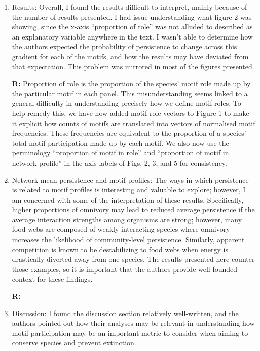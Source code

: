 \documentclass[12pt]{article}
\begin{document}
\begin{enumerate}
            \item Results: Overall, I found the results difficult to interpret, mainly because of the number of results presented. I had issue understanding what figure 2 was showing, since the x-axis ``proportion of role'' was not alluded to described as an explanatory variable anywhere in the text. I wasn't able to determine how the authors expected the probability of persistence to change across this gradient for each of the motifs, and how the results may have deviated from that expectation. This problem was mirrored in most of the figures presented.

                \textbf{R:} Proportion of role is the proportion of the species' motif role made up by the particular motif in each panel. This misunderstanding seems linked to a general difficulty in understanding precisely how we define motif roles. To help remedy this, we have now added motif role vectors to Figure 1 to make it explicit how counts of motifs are translated into vectors of normalised motif frequencies. These frequencies are equivalent to the proportion of a species' total motif participation made up by each motif. We also now use the perminology ``proportion of motif in role'' and ``proportion of motif in network profile'' in the axis labels of Figs. 2, 3, and 5 for consistency.


            \item Network mean persistence and motif profiles: The ways in which persistence is related to motif profiles is interesting and valuable to explore; however, I am concerned with some of the interpretation of these results. Specifically, higher proportions of omnivory may lead to reduced average persistence if the average interaction strengths among organisms are strong; however, many food webs are composed of weakly interacting species where omnivory increases the likelihood of community-level persistence. Similarly, apparent competition is known to be destabilizing to food webs when energy is drastically diverted away from one species. The results presented here counter those examples, so it is important that the authors provide well-founded context for these findings.

                \textbf{R:}


            \item Discussion: I found the discussion section relatively well-written, and the authors pointed out how their analyses may be relevant in understanding how motif participation may be an important metric to consider when aiming to conserve species and prevent extinction.


\end{enumerate}
\end{document}
